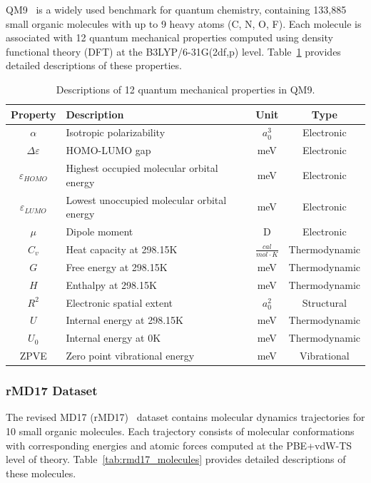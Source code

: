QM9~\cite{ramakrishnan2014quantum} is a widely used benchmark for quantum chemistry, containing 133,885 small organic molecules with up to 9 heavy atoms (C, N, O, F). Each molecule is associated with 12 quantum mechanical properties computed using density functional theory (DFT) at the B3LYP/6-31G(2df,p) level. Table~\ref{tab:qm9_properties} provides detailed descriptions of these properties.

\begin{table}[!htb]
  \centering
  \caption{Descriptions of 12 quantum mechanical properties in QM9.}
  \label{tab:qm9_properties}
  \scriptsize
    \begin{tabular}{clcc}
    \toprule
    \textbf{Property} & \textbf{Description} & \textbf{Unit} & \textbf{Type} \\
    \midrule
    $\alpha$ & Isotropic polarizability & $a_0^3$ & Electronic \\
    $\Delta\varepsilon$ & HOMO-LUMO gap & meV & Electronic \\
    $\varepsilon_{HOMO}$ & Highest occupied molecular orbital energy & meV & Electronic \\
    $\varepsilon_{LUMO}$ & Lowest unoccupied molecular orbital energy & meV & Electronic \\
    $\mu$ & Dipole moment & D & Electronic \\
    $C_v$ & Heat capacity at 298.15K & $\frac{cal}{mol \cdot K}$ & Thermodynamic \\
    $G$ & Free energy at 298.15K & meV & Thermodynamic \\
    $H$ & Enthalpy at 298.15K & meV & Thermodynamic \\
    $R^2$ & Electronic spatial extent & $a_0^2$ & Structural \\
    $U$ & Internal energy at 298.15K & meV & Thermodynamic \\
    $U_0$ & Internal energy at 0K & meV & Thermodynamic \\
    ZPVE & Zero point vibrational energy & meV & Vibrational \\
    \bottomrule
    \end{tabular}
\end{table}

\subsubsection{rMD17 Dataset}

The revised MD17 (rMD17)~\cite{christensen2020role} dataset contains molecular dynamics trajectories for 10 small organic molecules. Each trajectory consists of molecular conformations with corresponding energies and atomic forces computed at the PBE+vdW-TS level of theory. Table~\ref{tab:rmd17_molecules} provides detailed descriptions of these molecules.

